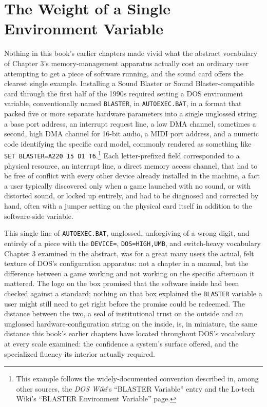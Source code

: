 \documentclass[11pt]{book}
\begin{document}
\section{The Weight of a Single Environment Variable}

Nothing in this book's earlier chapters made vivid what the abstract vocabulary of Chapter 3's memory-management apparatus actually cost an ordinary user attempting to get a piece of software running, and the sound card offers the clearest single example. Installing a Sound Blaster or Sound Blaster-compatible card through the first half of the 1990s required setting a DOS environment variable, conventionally named \texttt{BLASTER}, in \texttt{AUTOEXEC.BAT}, in a format that packed five or more separate hardware parameters into a single unglossed string: a base port address, an interrupt request line, a low DMA channel, sometimes a second, high DMA channel for 16-bit audio, a MIDI port address, and a numeric code identifying the specific card model, commonly rendered as something like \texttt{SET BLASTER=A220 I5 D1 T6}.\footnote{This example follows the widely-documented convention described in, among other sources, the \emph{DOS Wiki}'s \enquote{BLASTER Variable} entry and the Lo-tech Wiki's \enquote{BLASTER Environment Variable} page.} Each letter-prefixed field corresponded to a physical resource, an interrupt line, a direct memory access channel, that had to be free of conflict with every other device already installed in the machine, a fact a user typically discovered only when a game launched with no sound, or with distorted sound, or locked up entirely, and had to be diagnosed and corrected by hand, often with a jumper setting on the physical card itself in addition to the software-side variable.

This single line of \texttt{AUTOEXEC.BAT}, unglossed, unforgiving of a wrong digit, and entirely of a piece with the \texttt{DEVICE=}, \texttt{DOS=HIGH,UMB}, and switch-heavy vocabulary Chapter 3 examined in the abstract, was for a great many users the actual, felt texture of DOS's configuration apparatus: not a chapter in a manual, but the difference between a game working and not working on the specific afternoon it mattered. The logo on the box promised that the software inside had been checked against a standard; nothing on that box explained the \texttt{BLASTER} variable a user might still need to get right before the promise could be redeemed. The distance between the two, a seal of institutional trust on the outside and an unglossed hardware-configuration string on the inside, is, in miniature, the same distance this book's earlier chapters have located throughout DOS's vocabulary at every scale examined: the confidence a system's surface offered, and the specialized fluency its interior actually required.
\end{document}
